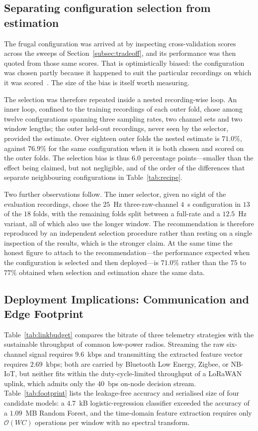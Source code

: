 \subsection{Separating configuration selection from estimation}
\label{subsec:nested}
The frugal configuration was arrived at by inspecting cross-validation scores
across the sweeps of Section~\ref{subsec:tradeoff}, and its performance was then
quoted from those same scores. That is optimistically biased: the configuration
was chosen partly because it happened to suit the particular recordings on which
it was scored~\cite{qi2019cv}. The size of the bias is itself worth measuring.

The selection was therefore repeated inside a nested recording-wise loop. An
inner loop, confined to the training recordings of each outer fold, chose among
twelve configurations spanning three sampling rates, two channel sets and two
window lengths; the outer held-out recordings, never seen by the selector,
provided the estimate. Over eighteen outer folds the nested estimate is
$\mathbf{71.0\%}$, against $76.9\%$ for the same configuration when it is both
chosen and scored on the outer folds. The selection bias is thus
$\mathbf{6.0}$ percentage points---smaller than the effect being claimed, but not
negligible, and of the order of the differences that separate neighbouring
configurations in Table~\ref{tab:recipe}.

Two further observations follow. The inner selector, given no sight of the
evaluation recordings, chose the $25$~Hz three-raw-channel $4$~s configuration in
$13$ of the $18$ folds, with the remaining folds split between a full-rate and a
$12.5$~Hz variant, all of which also use the longer window. The recommendation is
therefore reproduced by an independent selection procedure rather than resting on
a single inspection of the results, which is the stronger claim. At the same time
the honest figure to attach to the recommendation---the performance expected when
the configuration is selected and then deployed---is $71.0\%$ rather than the
$75$ to $77\%$ obtained when selection and estimation share the same data.

\subsection{Deployment Implications: Communication and Edge Footprint}
\label{subsec:edge}
Table~\ref{tab:linkbudget} compares the bitrate of three telemetry strategies
with the sustainable throughput of common low-power radios. Streaming the raw
six-channel signal requires $9.6$~kbps and transmitting the extracted feature
vector requires $2.69$~kbps; both are carried by Bluetooth Low Energy, Zigbee, or
NB-IoT, but neither fits within the duty-cycle-limited throughput of a LoRaWAN
uplink, which admits only the $40$~bps on-node decision stream.
Table~\ref{tab:footprint} lists the leakage-free accuracy and serialised size of
four candidate models: a $4.7$~kB logistic-regression classifier exceeded the
accuracy of a $1.09$~MB Random Forest, and the time-domain feature extraction
requires only $\mathcal{O}(WC)$ operations per window with no spectral transform.

